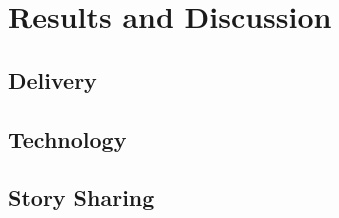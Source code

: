\chapter{Results and Discussion}


\section{Delivery}


\section{Technology}


\section{Story Sharing}

